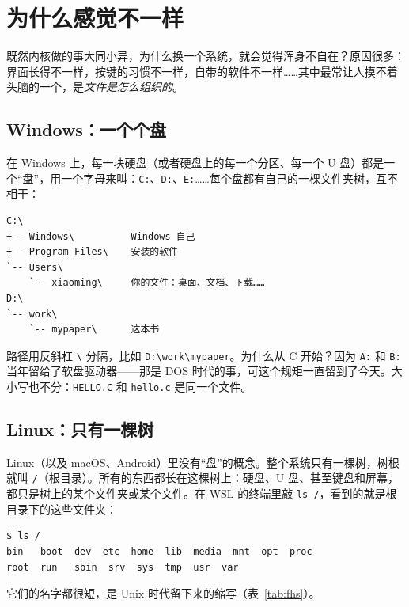 \section{为什么感觉不一样}

既然内核做的事大同小异，为什么换一个系统，就会觉得浑身不自在？原因很多：界面长得不一样，按键的习惯不一样，自带的软件不一样……其中最常让人摸不着头脑的一个，是\emph{文件是怎么组织的}。

\subsection{Windows：一个个盘}

在 Windows 上，每一块硬盘（或者硬盘上的每一个分区、每一个 U 盘）都是一个“盘”，用一个字母来叫：\texttt{C:}、\texttt{D:}、\texttt{E:}……每个盘都有自己的一棵文件夹树，互不相干：
\begin{verbatim}
C:\
+-- Windows\          Windows 自己
+-- Program Files\    安装的软件
`-- Users\
    `-- xiaoming\     你的文件：桌面、文档、下载……
D:\
`-- work\
    `-- mypaper\      这本书
\end{verbatim}
路径用反斜杠 \texttt{\textbackslash} 分隔，比如 \texttt{D:\textbackslash work\textbackslash mypaper}。为什么从 C 开始？因为 \texttt{A:} 和 \texttt{B:} 当年留给了软盘驱动器——那是 DOS 时代的事，可这个规矩一直留到了今天。大小写也不分：\texttt{HELLO.C} 和 \texttt{hello.c} 是同一个文件。

\subsection{Linux：只有一棵树}

Linux（以及 macOS、Android）里没有“盘”的概念。整个系统只有一棵树，树根就叫 \texttt{/}（根目录）。所有的东西都长在这棵树上：硬盘、U 盘、甚至键盘和屏幕，都只是树上的某个文件夹或某个文件。在 WSL 的终端里敲 \texttt{ls /}，看到的就是根目录下的这些文件夹：
\begin{verbatim}
$ ls /
bin   boot  dev  etc  home  lib  media  mnt  opt  proc
root  run   sbin  srv  sys  tmp  usr  var
\end{verbatim}
它们的名字都很短，是 Unix 时代留下来的缩写（表~\ref{tab:fhs}）。

